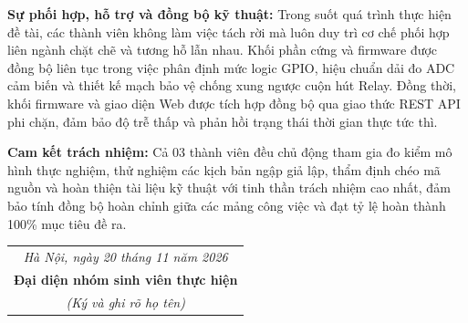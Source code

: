 \documentclass[12pt,a4paper]{report}
\begin{document}
\vspace{0.25cm}
\noindent
\textbf{Sự phối hợp, hỗ trợ và đồng bộ kỹ thuật:} Trong suốt quá trình thực hiện đề tài, các thành viên không làm việc tách rời mà luôn duy trì cơ chế phối hợp liên ngành chặt chẽ và tương hỗ lẫn nhau. Khối phần cứng và firmware được đồng bộ liên tục trong việc phân định mức logic GPIO, hiệu chuẩn dải đo ADC cảm biến và thiết kế mạch bảo vệ chống xung ngược cuộn hút Relay. Đồng thời, khối firmware và giao diện Web được tích hợp đồng bộ qua giao thức REST API phi chặn, đảm bảo độ trễ thấp và phản hồi trạng thái thời gian thực tức thì.

\vspace{0.2cm}
\noindent
\textbf{Cam kết trách nhiệm:} Cả 03 thành viên đều chủ động tham gia đo kiểm mô hình thực nghiệm, thử nghiệm các kịch bản ngập giả lập, thẩm định chéo mã nguồn và hoàn thiện tài liệu kỹ thuật với tinh thần trách nhiệm cao nhất, đảm bảo tính đồng bộ hoàn chỉnh giữa các mảng công việc và đạt tỷ lệ hoàn thành 100\% mục tiêu đề ra.

\vspace{0.7cm}
\noindent\hfill
\begin{tabular}{@{}c@{}}
    \textit{Hà Nội, ngày 20 tháng 11 năm 2026}\\[0.25cm]
    \textbf{Đại diện nhóm sinh viên thực hiện}\\[2.0cm]
    \textit{(Ký và ghi rõ họ tên)}
\end{tabular}

\newpage

\tableofcontents
\newpage
\listoffigures
\listoftables
\newpage








\end{document}
